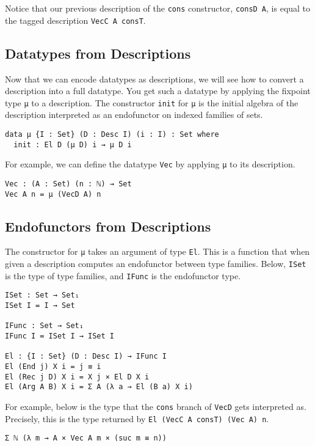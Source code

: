 \documentclass[preprint,nonatbib]{sigplanconf}
\begin{document}
Notice that our previous description of the {\tt cons} constructor,
{\tt consD A}, is equal to the tagged description
{\tt VecC A consT}.

\subsection{Datatypes from Descriptions}

Now that we can encode datatypes as descriptions, we will see how to
convert a description into a full datatype. You get such a datatype by
applying the fixpoint type {\tt μ} to a description.
The constructor {\tt init}
for {\tt μ} is the initial algebra of the description interpreted as
an endofunctor on indexed families of sets.

\begin{verbatim}
data μ {I : Set} (D : Desc I) (i : I) : Set where
  init : El D (μ D) i → μ D i
\end{verbatim}

For example, we can define the datatype {\tt Vec} by applying
{\tt μ} to its description.

\begin{verbatim}
Vec : (A : Set) (n : ℕ) → Set
Vec A n = μ (VecD A) n
\end{verbatim}

\subsection{Endofunctors from Descriptions}

The constructor for {\tt μ} takes an argument of type {\tt El}.
This is a function that when given a description computes an
endofunctor between type families. Below, {\tt ISet} is the type of
type families, and {\tt IFunc} is the endofunctor type.

\begin{verbatim}
ISet : Set → Set₁
ISet I = I → Set

IFunc : Set → Set₁
IFunc I = ISet I → ISet I

El : {I : Set} (D : Desc I) → IFunc I
El (End j) X i = j ≡ i
El (Rec j D) X i = X j × El D X i
El (Arg A B) X i = Σ A (λ a → El (B a) X i)
\end{verbatim}

For example, below is the type that the {\tt cons} branch of
{\tt VecD} gets interpreted as. Precisely, this is the type returned
by {\tt El (VecC A consT) (Vec A) n}.

\begin{verbatim}
Σ ℕ (λ m → A × Vec A m × (suc m ≡ n))
\end{verbatim}
\end{document}
